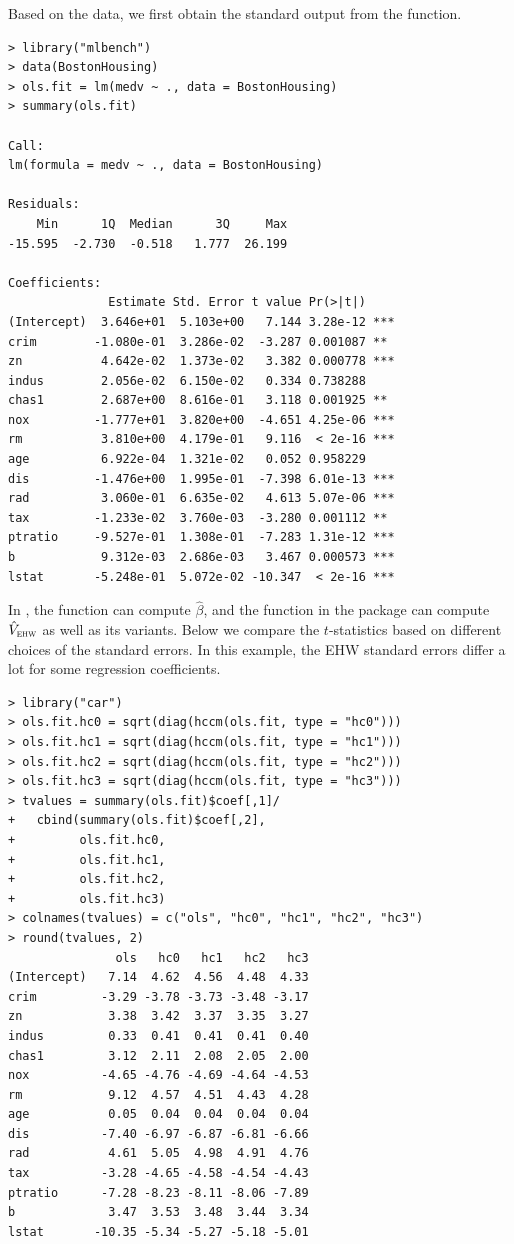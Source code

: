 Based on the  data, we first obtain the standard output from the  function. 

\begin{lstlisting}
> library("mlbench")
> data(BostonHousing)
> ols.fit = lm(medv ~ ., data = BostonHousing)
> summary(ols.fit)

Call:
lm(formula = medv ~ ., data = BostonHousing)

Residuals:
    Min      1Q  Median      3Q     Max 
-15.595  -2.730  -0.518   1.777  26.199 

Coefficients:
              Estimate Std. Error t value Pr(>|t|)    
(Intercept)  3.646e+01  5.103e+00   7.144 3.28e-12 ***
crim        -1.080e-01  3.286e-02  -3.287 0.001087 ** 
zn           4.642e-02  1.373e-02   3.382 0.000778 ***
indus        2.056e-02  6.150e-02   0.334 0.738288    
chas1        2.687e+00  8.616e-01   3.118 0.001925 ** 
nox         -1.777e+01  3.820e+00  -4.651 4.25e-06 ***
rm           3.810e+00  4.179e-01   9.116  < 2e-16 ***
age          6.922e-04  1.321e-02   0.052 0.958229    
dis         -1.476e+00  1.995e-01  -7.398 6.01e-13 ***
rad          3.060e-01  6.635e-02   4.613 5.07e-06 ***
tax         -1.233e-02  3.760e-03  -3.280 0.001112 ** 
ptratio     -9.527e-01  1.308e-01  -7.283 1.31e-12 ***
b            9.312e-03  2.686e-03   3.467 0.000573 ***
lstat       -5.248e-01  5.072e-02 -10.347  < 2e-16 ***
\end{lstlisting}


In , the  function can compute $\hat{\beta}$, and the  function in the package  can compute $\hat{V}_\textsc{ehw} $ as well as its variants. Below we compare the $t$-statistics based on different choices of the standard errors. In this example, the EHW standard errors differ a lot for some regression coefficients. 

\begin{lstlisting}
> library("car")
> ols.fit.hc0 = sqrt(diag(hccm(ols.fit, type = "hc0")))
> ols.fit.hc1 = sqrt(diag(hccm(ols.fit, type = "hc1")))
> ols.fit.hc2 = sqrt(diag(hccm(ols.fit, type = "hc2")))
> ols.fit.hc3 = sqrt(diag(hccm(ols.fit, type = "hc3")))
> tvalues = summary(ols.fit)$coef[,1]/
+   cbind(summary(ols.fit)$coef[,2], 
+         ols.fit.hc0, 
+         ols.fit.hc1, 
+         ols.fit.hc2, 
+         ols.fit.hc3)
> colnames(tvalues) = c("ols", "hc0", "hc1", "hc2", "hc3")
> round(tvalues, 2)
               ols   hc0   hc1   hc2   hc3
(Intercept)   7.14  4.62  4.56  4.48  4.33
crim         -3.29 -3.78 -3.73 -3.48 -3.17
zn            3.38  3.42  3.37  3.35  3.27
indus         0.33  0.41  0.41  0.41  0.40
chas1         3.12  2.11  2.08  2.05  2.00
nox          -4.65 -4.76 -4.69 -4.64 -4.53
rm            9.12  4.57  4.51  4.43  4.28
age           0.05  0.04  0.04  0.04  0.04
dis          -7.40 -6.97 -6.87 -6.81 -6.66
rad           4.61  5.05  4.98  4.91  4.76
tax          -3.28 -4.65 -4.58 -4.54 -4.43
ptratio      -7.28 -8.23 -8.11 -8.06 -7.89
b             3.47  3.53  3.48  3.44  3.34
lstat       -10.35 -5.34 -5.27 -5.18 -5.01
\end{lstlisting}




